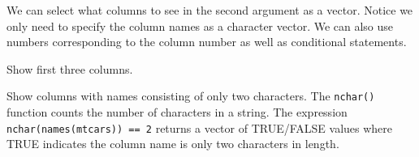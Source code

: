 \documentclass[
]{book}
\newenvironment{Shaded}{\begin{snugshade}}{\end{snugshade}}
\newcommand{\DecValTok}[1]{\textcolor[rgb]{0.00,0.00,0.81}{#1}}
\newcommand{\FloatTok}[1]{\textcolor[rgb]{0.00,0.00,0.81}{#1}}
\newcommand{\FunctionTok}[1]{\textcolor[rgb]{0.00,0.00,0.00}{#1}}
\newcommand{\NormalTok}[1]{#1}
\newcommand{\SpecialCharTok}[1]{\textcolor[rgb]{0.00,0.00,0.00}{#1}}
\newcommand{\StringTok}[1]{\textcolor[rgb]{0.31,0.60,0.02}{#1}}
\begin{document}
We can select what columns to see in the second argument as a vector. Notice we only need to specify the column names as a character vector. We can also use numbers corresponding to the column number as well as conditional statements.

\begin{Shaded}
\end{Shaded}

Show first three columns.

\begin{Shaded}
\end{Shaded}

Show columns with names consisting of only two characters. The \texttt{nchar()} function counts the number of characters in a string. The expression \texttt{nchar(names(mtcars))\ ==\ 2} returns a vector of TRUE/FALSE values where TRUE indicates the column name is only two characters in length.

\begin{Shaded}
\end{Shaded}
\end{document}
